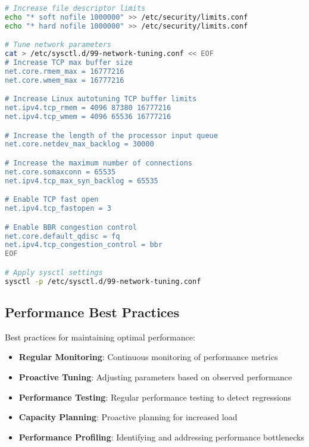 \begin{lstlisting}[language=bash, caption=System Tuning Example]
# Increase file descriptor limits
echo "* soft nofile 1000000" >> /etc/security/limits.conf
echo "* hard nofile 1000000" >> /etc/security/limits.conf

# Tune network parameters
cat > /etc/sysctl.d/99-network-tuning.conf << EOF
# Increase TCP max buffer size
net.core.rmem_max = 16777216
net.core.wmem_max = 16777216

# Increase Linux autotuning TCP buffer limits
net.ipv4.tcp_rmem = 4096 87380 16777216
net.ipv4.tcp_wmem = 4096 65536 16777216

# Increase the length of the processor input queue
net.core.netdev_max_backlog = 30000

# Increase the maximum number of connections
net.core.somaxconn = 65535
net.ipv4.tcp_max_syn_backlog = 65535

# Enable TCP fast open
net.ipv4.tcp_fastopen = 3

# Enable BBR congestion control
net.core.default_qdisc = fq
net.ipv4.tcp_congestion_control = bbr
EOF

# Apply sysctl settings
sysctl -p /etc/sysctl.d/99-network-tuning.conf
\end{lstlisting}

\subsection{Performance Best Practices}
Best practices for maintaining optimal performance:

\begin{itemize}
    \item \textbf{Regular Monitoring}: Continuous monitoring of performance metrics
    \item \textbf{Proactive Tuning}: Adjusting parameters based on observed performance
    \item \textbf{Performance Testing}: Regular performance testing to detect regressions
    \item \textbf{Capacity Planning}: Proactive planning for increased load
    \item \textbf{Performance Profiling}: Identifying and addressing performance bottlenecks
\end{itemize}